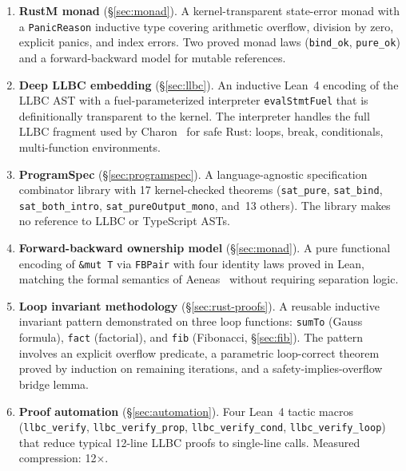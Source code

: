 \begin{enumerate}[label=\textbf{C\arabic*.},leftmargin=2em]
  \item \textbf{RustM monad} (\S\ref{sec:monad}). A kernel-transparent
        state-error monad with a \texttt{PanicReason} inductive type covering
        arithmetic overflow, division by zero, explicit panics, and index
        errors. Two proved monad laws (\texttt{bind\_ok}, \texttt{pure\_ok})
        and a forward-backward model for mutable references.

  \item \textbf{Deep LLBC embedding} (\S\ref{sec:llbc}). An inductive Lean~4
        encoding of the LLBC AST with a fuel-parameterized interpreter
        \texttt{evalStmtFuel} that is definitionally transparent to the kernel.
        The interpreter handles the full LLBC fragment used by Charon~\cite{charon2024}
        for safe Rust: loops, break, conditionals, multi-function environments.

  \item \textbf{ProgramSpec} (\S\ref{sec:programspec}). A language-agnostic
        specification combinator library with 17 kernel-checked theorems
        (\texttt{sat\_pure}, \texttt{sat\_bind}, \texttt{sat\_both\_intro},
        \texttt{sat\_pureOutput\_mono}, and~13 others). The library makes no
        reference to LLBC or TypeScript ASTs.

  \item \textbf{Forward-backward ownership model} (\S\ref{sec:monad}). A pure
        functional encoding of \texttt{\&mut T} via \texttt{FBPair} with four
        identity laws proved in Lean, matching the formal semantics of
        Aeneas~\cite{ho2022aeneas} without requiring separation logic.

  \item \textbf{Loop invariant methodology} (\S\ref{sec:rust-proofs}). A
        reusable inductive invariant pattern demonstrated on three loop
        functions: \texttt{sumTo} (Gauss formula), \texttt{fact} (factorial),
        and \texttt{fib} (Fibonacci, \S\ref{sec:fib}). The pattern involves an
        explicit overflow predicate, a parametric loop-correct theorem proved
        by induction on remaining iterations, and a safety-implies-overflow
        bridge lemma.

  \item \textbf{Proof automation} (\S\ref{sec:automation}). Four Lean~4 tactic
        macros (\texttt{llbc\_verify}, \texttt{llbc\_verify\_prop},
        \texttt{llbc\_verify\_cond}, \texttt{llbc\_verify\_loop}) that reduce
        typical 12-line LLBC proofs to single-line calls. Measured compression:
        12$\times$.


\end{enumerate}
